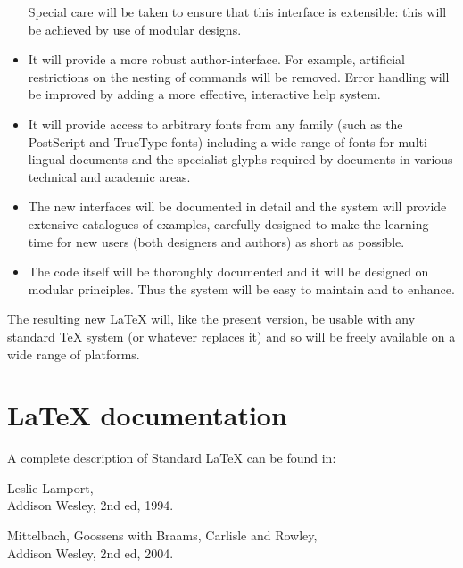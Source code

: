 \documentclass[a4paper]{article}
\newenvironment{citations}{%
   \list{}{%
      \renewcommand{\makelabel}[1]{\normalfont\itshape ##1}%
   }%
}{%
   \endlist
}
\newcommand{\AW}{Addison Wesley}
\newcommand{\PS}{{\sc Post\-Script}}
\begin{document}
\begin{itemize}
\begin{itemize}
 \end{itemize}

 Special care will be taken to ensure that this interface is
 extensible: this will be achieved by use of modular designs.


  \item
  It will provide a more robust author-interface. For example,
  artificial restrictions on the nesting of commands will be removed.
  Error handling will be improved by adding
  a more effective, interactive help system.

  \item
  It will provide access to arbitrary fonts from any family (such as
  the \PS{} and TrueType fonts) including a wide range of fonts for
  multi-lingual documents and the specialist glyphs required by
  documents in various technical and academic areas.

  \item
  The new interfaces will be documented in detail and the
  system will provide extensive catalogues of examples, carefully
  designed to make the learning time for new users (both designers and
  authors) as short as possible.

 \item
  The code itself will be thoroughly documented and it will be
  designed on modular principles.  Thus the system will be easy to
  maintain and to enhance.
\end{itemize}

The resulting new \LaTeX{} will, like the present version, be usable
with any standard \TeX{} system (or whatever replaces it) and so will
be freely available on a wide range of platforms.


\section{\LaTeX{} documentation}

\begingroup
\setlength{\parindent}{0pt}

A complete description of Standard \LaTeX{} can be found in:
\begin{citations}
\item[\LaTeX: A Document Preparation System]
   Leslie Lamport,\\ \AW, 2nd ed, 1994.
\item[The \LaTeX{} Companion]
   Mittelbach, Goossens with Braams, Carlisle and Rowley,\\ \AW, 2nd ed, 2004.
\end{citations}
\end{document}
